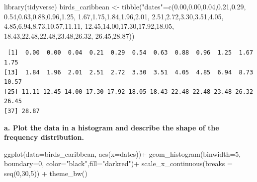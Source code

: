 \documentclass[
  letterpaper,
  DIV=11,
  numbers=noendperiod]{scrreprt}
\newenvironment{Shaded}{\begin{snugshade}}{\end{snugshade}}
\newcommand{\AttributeTok}[1]{\textcolor[rgb]{0.40,0.45,0.13}{#1}}
\newcommand{\DecValTok}[1]{\textcolor[rgb]{0.68,0.00,0.00}{#1}}
\newcommand{\FloatTok}[1]{\textcolor[rgb]{0.68,0.00,0.00}{#1}}
\newcommand{\FunctionTok}[1]{\textcolor[rgb]{0.28,0.35,0.67}{#1}}
\newcommand{\NormalTok}[1]{\textcolor[rgb]{0.00,0.23,0.31}{#1}}
\newcommand{\OtherTok}[1]{\textcolor[rgb]{0.00,0.23,0.31}{#1}}
\newcommand{\SpecialCharTok}[1]{\textcolor[rgb]{0.37,0.37,0.37}{#1}}
\newcommand{\StringTok}[1]{\textcolor[rgb]{0.13,0.47,0.30}{#1}}
\begin{document}
\begin{Shaded}
\begin{Highlighting}[]
\FunctionTok{library}\NormalTok{(tidyverse)}
\NormalTok{birds\_caribbean }\OtherTok{\textless{}{-}} \FunctionTok{tibble}\NormalTok{(}\StringTok{"dates"}\OtherTok{=}\FunctionTok{c}\NormalTok{(}\FloatTok{0.00}\NormalTok{,}\FloatTok{0.00}\NormalTok{,}\FloatTok{0.04}\NormalTok{,}\FloatTok{0.21}\NormalTok{,}\FloatTok{0.29}\NormalTok{,}
\FloatTok{0.54}\NormalTok{,}\FloatTok{0.63}\NormalTok{,}\FloatTok{0.88}\NormalTok{,}\FloatTok{0.96}\NormalTok{,}\FloatTok{1.25}\NormalTok{,}
\FloatTok{1.67}\NormalTok{,}\FloatTok{1.75}\NormalTok{,}\FloatTok{1.84}\NormalTok{,}\FloatTok{1.96}\NormalTok{,}\FloatTok{2.01}\NormalTok{,}
\FloatTok{2.51}\NormalTok{,}\FloatTok{2.72}\NormalTok{,}\FloatTok{3.30}\NormalTok{,}\FloatTok{3.51}\NormalTok{,}\FloatTok{4.05}\NormalTok{,}
\FloatTok{4.85}\NormalTok{,}\FloatTok{6.94}\NormalTok{,}\FloatTok{8.73}\NormalTok{,}\FloatTok{10.57}\NormalTok{,}\FloatTok{11.11}\NormalTok{,}
\FloatTok{12.45}\NormalTok{,}\FloatTok{14.00}\NormalTok{,}\FloatTok{17.30}\NormalTok{,}\FloatTok{17.92}\NormalTok{,}\FloatTok{18.05}\NormalTok{,}
\FloatTok{18.43}\NormalTok{,}\FloatTok{22.48}\NormalTok{,}\FloatTok{22.48}\NormalTok{,}\FloatTok{23.48}\NormalTok{,}\FloatTok{26.32}\NormalTok{,}
\FloatTok{26.45}\NormalTok{,}\FloatTok{28.87}\NormalTok{))}
\end{Highlighting}
\end{Shaded}

\begin{Shaded}
\end{Shaded}

\begin{verbatim}
 [1]  0.00  0.00  0.04  0.21  0.29  0.54  0.63  0.88  0.96  1.25  1.67  1.75
[13]  1.84  1.96  2.01  2.51  2.72  3.30  3.51  4.05  4.85  6.94  8.73 10.57
[25] 11.11 12.45 14.00 17.30 17.92 18.05 18.43 22.48 22.48 23.48 26.32 26.45
[37] 28.87
\end{verbatim}

\textbf{a. Plot the data in a histogram and describe the shape of the
frequency distribution.}

\begin{Shaded}
\begin{Highlighting}[]
\FunctionTok{ggplot}\NormalTok{(}\AttributeTok{data=}\NormalTok{birds\_caribbean, }\FunctionTok{aes}\NormalTok{(}\AttributeTok{x=}\NormalTok{dates))}\SpecialCharTok{+}
  \FunctionTok{geom\_histogram}\NormalTok{(}\AttributeTok{binwidth=}\DecValTok{5}\NormalTok{, }\AttributeTok{boundary=}\DecValTok{0}\NormalTok{, }\AttributeTok{color=}\StringTok{"black"}\NormalTok{,}\AttributeTok{fill=}\StringTok{"darkred"}\NormalTok{)}\SpecialCharTok{+}
  \FunctionTok{scale\_x\_continuous}\NormalTok{(}\AttributeTok{breaks =} \FunctionTok{seq}\NormalTok{(}\DecValTok{0}\NormalTok{,}\DecValTok{30}\NormalTok{,}\DecValTok{5}\NormalTok{)) }\SpecialCharTok{+}
  \FunctionTok{theme\_bw}\NormalTok{()}
\end{Highlighting}
\end{Shaded}
\end{document}
